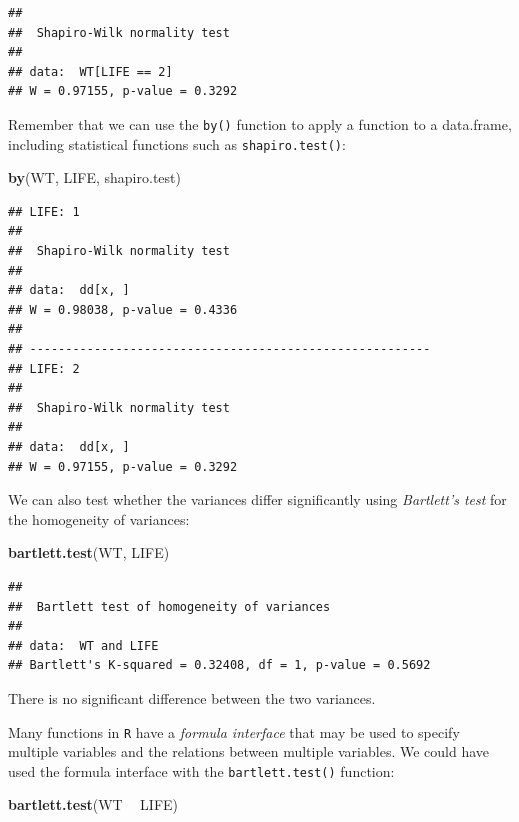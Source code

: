 \documentclass[]{book}
\newenvironment{Shaded}{\begin{snugshade}}{\end{snugshade}}
\newcommand{\KeywordTok}[1]{\textcolor[rgb]{0.13,0.29,0.53}{\textbf{#1}}}
\newcommand{\StringTok}[1]{\textcolor[rgb]{0.31,0.60,0.02}{#1}}
\newcommand{\OperatorTok}[1]{\textcolor[rgb]{0.81,0.36,0.00}{\textbf{#1}}}
\newcommand{\NormalTok}[1]{#1}
\theoremstyle{definition}
\theoremstyle{definition}
\theoremstyle{definition}
\theoremstyle{remark}
\begin{document}
\begin{verbatim}
## 
##  Shapiro-Wilk normality test
## 
## data:  WT[LIFE == 2]
## W = 0.97155, p-value = 0.3292
\end{verbatim}

Remember that we can use the \texttt{by()} function to apply a function
to a data.frame, including statistical functions such as
\texttt{shapiro.test()}:

\begin{Shaded}
\begin{Highlighting}[]
\KeywordTok{by}\NormalTok{(WT, LIFE, shapiro.test)}
\end{Highlighting}
\end{Shaded}

\begin{verbatim}
## LIFE: 1
## 
##  Shapiro-Wilk normality test
## 
## data:  dd[x, ]
## W = 0.98038, p-value = 0.4336
## 
## -------------------------------------------------------- 
## LIFE: 2
## 
##  Shapiro-Wilk normality test
## 
## data:  dd[x, ]
## W = 0.97155, p-value = 0.3292
\end{verbatim}

We can also test whether the variances differ significantly using
\emph{Bartlett's test} for the homogeneity of variances:

\begin{Shaded}
\begin{Highlighting}[]
\KeywordTok{bartlett.test}\NormalTok{(WT, LIFE)}
\end{Highlighting}
\end{Shaded}

\begin{verbatim}
## 
##  Bartlett test of homogeneity of variances
## 
## data:  WT and LIFE
## Bartlett's K-squared = 0.32408, df = 1, p-value = 0.5692
\end{verbatim}

There is no significant difference between the two variances.

Many functions in \texttt{R} have a \emph{formula interface} that may be
used to specify multiple variables and the relations between multiple
variables. We could have used the formula interface with the
\texttt{bartlett.test()} function:

\begin{Shaded}
\begin{Highlighting}[]
\KeywordTok{bartlett.test}\NormalTok{(WT }\OperatorTok{~}\StringTok{ }\NormalTok{LIFE)}
\end{Highlighting}
\end{Shaded}
\end{document}

